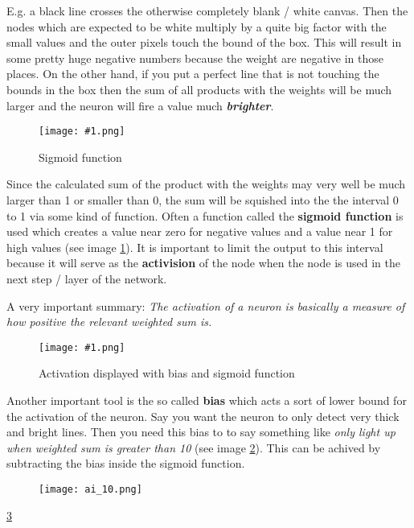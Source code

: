 \documentclass{article}
\newcommand{\lbl}[1]{(see image \ref{#1})}
\newcommand{\img}[1]{
	\centering
	\texttt{[image: \#1.png]}
	\label{#1}
}
\begin{document}
E.g. a black line crosses the otherwise completely blank / white canvas. Then the nodes which are expected to be white multiply by a quite big factor with the small values and the outer pixels touch the bound of the box. This will result in some pretty huge negative numbers because the weight are negative in those places. On the other hand, if you put a perfect line that is not touching the bounds in the box then the sum of all products with the weights will be much larger and the neuron will fire a value much \textit{\textbf{brighter}}.

\begin{figure}[h]
\img{ai_9}
\caption{Sigmoid function}
\end{figure}

Since the calculated sum of the product with the weights may very well be much larger than 1 or smaller than 0, the sum will be squished into the the interval 0 to 1 via some kind of function. Often a function called the \textbf{sigmoid function} is used which creates a value near zero for negative values and a value near 1 for high values \lbl{ai_9}. It is important to limit the output to this interval because it will serve as the \textbf{activision} of the node when the node is used in the next step / layer of the network. 

A very important summary: \textit{The activation of a neuron is basically a measure of how positive the relevant weighted sum is.}


\begin{figure}[h]
\img{ai_10}
\caption{Activation displayed with bias and sigmoid function}
\end{figure}

Another important tool is the so called \textbf{bias} which acts a sort of lower bound for the activation of the neuron. Say you want the neuron to only detect very thick and bright lines. Then you need this bias to to say something like \textit{only light up when weighted sum is greater than 10} \lbl{ai_10}. This can be achived by subtracting the bias inside the sigmoid function.


\begin{figure}[h]
	\centering
	\texttt{[image: ai\_10.png]}
	\label{fig:ai_10}
\end{figure}

\ref{fig:ai_10}
\end{document}
